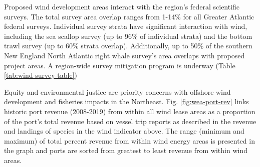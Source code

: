 \documentclass[
  10pt,
]{article}
\let\origtable\table
\let\endorigtable\endtable
\renewenvironment{table}[1][2] {
    \expandafter\origtable\expandafter[H]
} {
    \endorigtable
}
\begin{document}
Proposed wind development areas interact with the region's federal
scientific surveys. The total survey area overlap ranges from 1-14\% for
all Greater Atlantic federal surveys. Individual survey strata have
significant interaction with wind, including the sea scallop survey (up
to 96\% of individual strata) and the bottom trawl survey (up to 60\%
strata overlap). Additionally, up to 50\% of the southern New England
North Atlantic right whale survey's area overlaps with proposed project
areas. A region-wide survey mitigation program is underway (Table
\ref{tab:wind-survey-table})

\begin{table}

\caption{\label{tab:wind-survey-table}Survey mitigation planning.}
\centering
{}
\end{table}

Equity and environmental justice are priority concerns with offshore
wind development and fisheries impacts in the Northeast. Fig.
\ref{fig:wea-port-rev} links historic port revenue (2008-2019) from
within all wind lease areas as a proportion of the port's total revenue
based on vessel trip reports as described in the revenue and landings of
species in the wind indicator above. The range (minimum and maximum) of
total percent revenue from within wind energy areas is presented in the
graph and ports are sorted from greatest to least revenue from within
wind areas.
\end{document}
